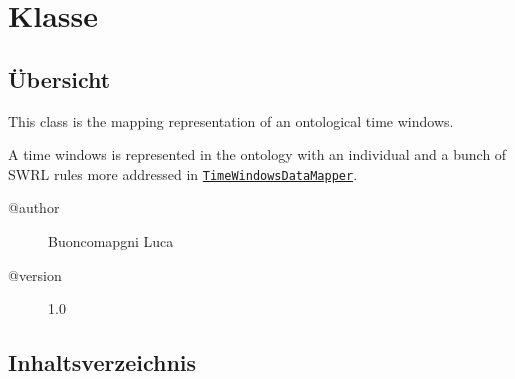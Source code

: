 
\section[TimeWindow]{Klasse }\label{ontologyFramework.OFDataMapping.ReservatedDataType.TimeWindow-class}
\subsection{Übersicht}
This class is the mapping representation of an ontological time windows.
  
 A time windows is represented in the ontology with an individual and a bunch
 of SWRL rules more addressed in \texttt{\hyperlink{ontologyFramework.OFDataMapping.complexDataType.TimeWindowsDataMapper-class}{TimeWindowsDataMapper}}.
\begin{description}
\item[@author] 
Buoncomapgni Luca
\item[@version] 
1.0
\end{description}
\subsection{Inhaltsverzeichnis}
